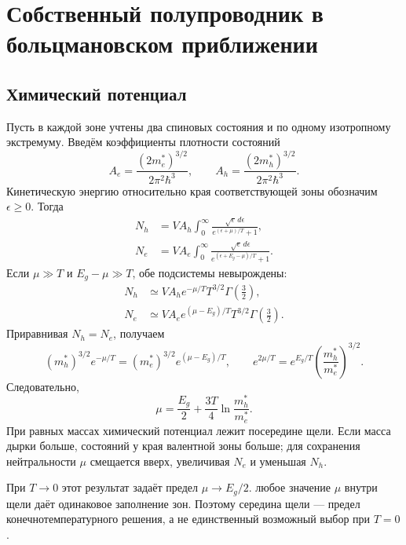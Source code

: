 \documentclass[../final.tex]{subfiles}
\begin{document}
\section{Собственный полупроводник в больцмановском приближении}
\subsection{Химический потенциал}
Пусть в каждой зоне учтены два спиновых состояния и по одному изотропному
экстремуму. Введём коэффициенты плотности состояний
\begin{equation*}
 A_e=\frac{(2m_e^*)^{3/2}}{2\pi^2\hbar^3},\qquad
 A_h=\frac{(2m_h^*)^{3/2}}{2\pi^2\hbar^3}.
\end{equation*}
Кинетическую энергию относительно края соответствующей зоны обозначим
$\epsilon\geq0$. Тогда
\begin{align*}
 N_h&=VA_h\int_0^\infty\frac{\sqrt\epsilon\,d\epsilon}
 {e^{(\epsilon+\mu)/T}+1},\\
 N_e&=VA_e\int_0^\infty\frac{\sqrt\epsilon\,d\epsilon}
 {e^{(\epsilon+E_g-\mu)/T}+1}.
\end{align*}
Если $\mu\gg T$ и $E_g-\mu\gg T$, обе подсистемы невырождены:
\begin{align*}
 N_h&\simeq VA_h e^{-\mu/T}T^{3/2}\Gamma\left(\frac32\right),\\
 N_e&\simeq VA_e e^{(\mu-E_g)/T}T^{3/2}\Gamma\left(\frac32\right).
\end{align*}
Приравнивая $N_h=N_e$, получаем
\begin{equation*}
 (m_h^*)^{3/2}e^{-\mu/T}=(m_e^*)^{3/2}e^{(\mu-E_g)/T},
 \qquad
 e^{2\mu/T}=e^{E_g/T}\left(\frac{m_h^*}{m_e^*}\right)^{3/2}.
\end{equation*}
Следовательно,
\begin{equation*}
 \mu=\frac{E_g}{2}+\frac{3T}{4}\ln\frac{m_h^*}{m_e^*}.
\end{equation*}
При равных массах химический потенциал лежит посередине щели.
Если масса дырки больше, состояний у края валентной зоны больше;
для сохранения нейтральности $\mu$ смещается вверх, увеличивая $N_e$
и уменьшая $N_h$.

При $T\to0$ этот результат задаёт предел $\mu\to E_g/2$.
 любое значение $\mu$ внутри щели
даёт одинаковое заполнение зон. Поэтому середина щели --- предел
конечнотемпературного решения, а не единственный возможный выбор при $T=0$.

\end{document}
